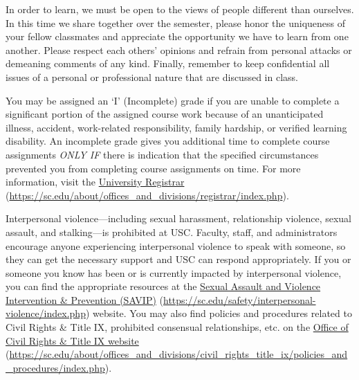\documentclass[11pt,letterpaper]{article}
\begin{document}

In order to learn, we must be open to the views of people different than ourselves. In this time we share together over the semester, please honor the uniqueness of your fellow classmates and appreciate the opportunity we have to learn from one another. Please respect each others' opinions and refrain from personal attacks or demeaning comments of any kind. Finally, remember to keep confidential all issues of a personal or professional nature that are discussed in class. \sectionbreak




You may be assigned an `I' (Incomplete) grade if you are unable to complete a significant portion of the assigned course work because of an unanticipated illness, accident, work-related responsibility, family hardship, or verified learning disability. An incomplete grade gives you additional time to complete course assignments {\itshape ONLY IF} there is indication that the specified circumstances prevented you from completing course assignments on time. For more information, visit the \href{https://sc.edu/about/offices\_and\_divisions/registrar/index.php}{University Registrar} (\url{https://sc.edu/about/offices\_and\_divisions/registrar/index.php}). \sectionbreak




Interpersonal violence---including sexual harassment, relationship violence, sexual assault, and stalking---is prohibited at USC. Faculty, staff, and administrators encourage anyone experiencing interpersonal violence to speak with someone, so they can get the necessary support and USC can respond appropriately. If you or someone you know has been or is currently impacted by interpersonal violence, you can find the appropriate resources at the \href{https://sc.edu/safety/interpersonal-violence/index.php}{Sexual Assault and Violence Intervention \& Prevention (SAVIP)} (\url{https://sc.edu/safety/interpersonal-violence/index.php}) website. You may also find policies and procedures related to Civil Rights \& Title IX, prohibited consensual relationships, etc. on the \href{https://sc.edu/about/offices\_and\_divisions/civil\_rights\_title\_ix/policies\_and\_procedures/index.php}{Office of Civil Rights \& Title IX website} (\url{https://sc.edu/about/offices\_and\_divisions/civil\_rights\_title\_ix/policies\_and\_procedures/index.php}). \pspace
\end{document}
